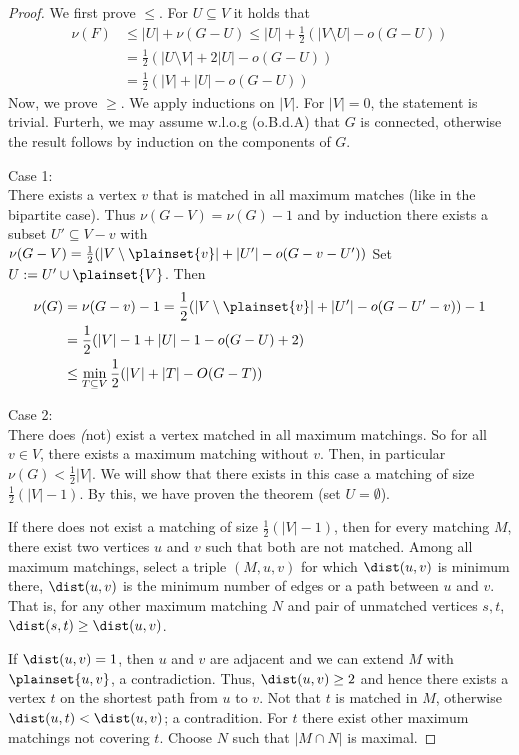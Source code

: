\begin{proof}
	We first prove $\leq$. For $U \subseteq V$ it holds that 
	\begin{align*}
		\nu(F) &\leq |U| + \nu(G-U) \leq |U| + \frac{1}{2} (| V \setminus U| - o(G-U)) \\
		       &= \frac{1}{2}(|U \setminus V| + 2 |U| - o(G-U)) \\
					 &= \frac{1}{2}(|V| + |U| - o(G-U))
	\end{align*}
	Now, we prove $\geq$. We apply inductions on $|V|$. For $|V| = 0$, the statement is trivial.
	Furterh, we may assume w.l.o.g (o.B.d.A) that $G$ is connected, otherwise the
	result follows by induction on the components of $G$.
	
	Case 1: \\
	There exists a vertex $v$ that is matched in all maximum matches (like in the 
	bipartite case). Thus $\nu (G-V) = \nu (G)-1$ and by induction there exists
	a subset $U'\subseteq V-v$ with $\nu (G-V) = \frac{1}{2}(|V\setminus \plainset{v}|+ |U'|-o(G-v-U'))$
	Set $U:=U' \cup \plainset{V}$. Then \begin{align*}
		\nu(G) &= \nu(G-v)-1=\frac{1}{2}(|V\setminus \plainset{v}|+ |U'| - o(G-U'-v))-1 \\
		       &= \frac12 (|V| - 1 + |U| - 1 - o(G-U) + 2) \\
					 &\leq \min_{T \subseteq V}\frac12(|V|+|T| -O(G-T))
	\end{align*}
	
	Case 2: \\
	There does \emph(not) exist a vertex matched in all maximum matchings. So for 
	all $v \in V$, there exists a maximum matching without $v$. Then, in particular
	$\nu(G)<\frac12|V|$. We will show that there exists in this case a matching 
	of size $\frac12(|V|-1)$. By this, we have proven the theorem (set $U=\emptyset$).

	If there does not exist a matching of size $\frac12(|V|-1)$, then for every
	matching $M$, there exist two vertices $u$ and $v$ such that both are not 
	matched. Among all maximum matchings, select a triple $(M,u,v)$ for which 
	$\dist(u,v)$ is minimum there, $\dist(u,v)$ is the minimum number of edges 
	or a path between $u$ and $v$. That is, for any other maximum matching $N$
	and pair of unmatched vertices $s,t$, $\dist(s,t) \geq \dist(u,v)$.
	
	If $\dist(u,v)=1$, then $u$ and $v$ are adjacent and we can extend $M$ with 
	$\plainset{u,v}$, a contradiction. Thus, $\dist(u,v)\geq 2$ and hence there 
	exists a vertex $t$ on the shortest path from $u$ to $v$. Not that $t$ is 
	matched in $M$, otherwise $\dist(u,t)<\dist(u,v)$; a contradition.	For $t$ 
	there exist other maximum matchings not covering $t$. Choose $N$ such that 
	$|M \cap N|$ is maximal.
	

\end{proof}
